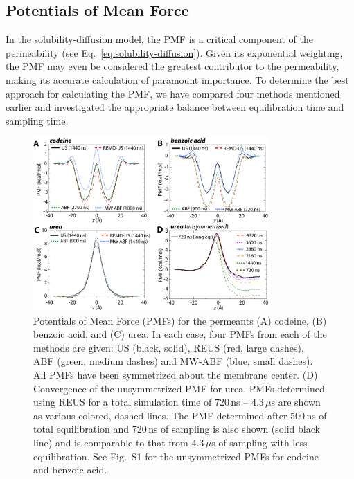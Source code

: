\subsection{Potentials of Mean Force}
\par In the solubility-diffusion model, the PMF is a critical component of the permeability (see Eq.~\ref{eq:solubility-diffusion}). Given its exponential weighting, the PMF may even be considered the greatest contributor to the permeability, making its accurate calculation of paramount importance.  To determine the best approach for calculating the PMF, we have compared four methods mentioned earlier and investigated the appropriate balance between equilibration time and sampling time.

\begin{figure}[htbp]
\begin{center}
\includegraphics[width=0.8\textwidth]{Figures/PMFs-all}
\caption[Potentials of Mean Force for the permeants codeine, benzoic acid, and urea]{Potentials of Mean Force (PMFs) for the permeants (A) codeine, (B) benzoic acid, and (C) urea.  In each case, four PMFs from each of the methods are given: US (black, solid), REUS (red, large dashes), ABF (green, medium dashes) and MW-ABF (blue, small dashes).  All PMFs have been symmetrized about the membrane center.  (D) Convergence of the unsymmetrized PMF for urea.  PMFs determined using REUS for a total simulation time of 720\,ns -- 4.3\,$\mu$s are shown as various colored, dashed lines.  The PMF determined after 500\,ns of total equilibration and 720\,ns of sampling is also shown (solid black line) and is comparable to that from 4.3\,$\mu$s of sampling with less equilibration. See Fig.~S1 for the unsymmetrized PMFs for codeine and benzoic acid.}
\label{fig:PMFs}
\end{center}
\end{figure}

